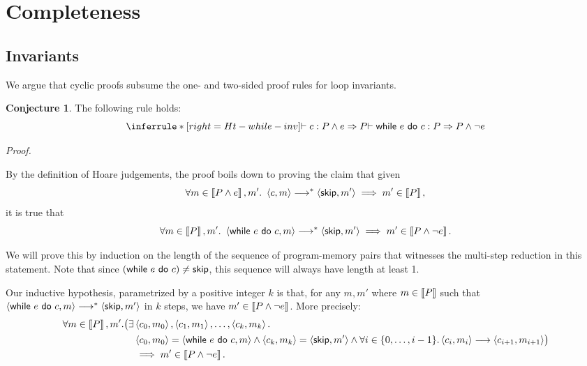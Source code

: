 \documentclass[10pt]{article}
\theoremstyle{definition}
\newtheorem{conjecture}{Conjecture}
\begin{document}
\section{Completeness}

\subsection*{Invariants}

We argue that cyclic proofs subsume the one- and two-sided proof rules for loop invariants.


\begin{conjecture}
The following rule holds:
\begin{displaymath}
    \inferrule*[right=Ht-while-inv]
    { \DER \Triple c : P \wedge e => P }
    { \DER \Triple \While e do c : P => P \wedge \neg e }
\end{displaymath}
\end{conjecture}

\noindent
\emph{Proof.}

\noindent
By the definition of Hoare judgements, the proof boils down to proving 
the claim that given 
\[
    \forall m \in \Interp{P \wedge e}, m'.\
    \Cfg(c, m) \sstepstotrans \Cfg(\Skip, m') 
    \implies m' \in \Interp{P},
\]
it is true that 
\[
    \forall m \in \Interp{P}, m'.\
    \Cfg(\While e do c, m) \sstepstotrans \Cfg(\Skip, m')
    \implies m' \in \Interp{P \wedge \neg e}.
\]

We will prove this by induction on the length of the sequence of program-memory pairs that witnesses 
the multi-step reduction in this statement. Note that since $(\While e do c) \neq \Skip$, 
this sequence will always have length at least 1.

Our inductive hypothesis, parametrized by a positive integer $k$ is that, 
for any $m, m'$ where $m \in \left\llbracket P \right\rrbracket$ such that 
$\Cfg(\While e do c, m) \sstepstotrans \Cfg(\Skip, m')$ in $k$ steps, 
we have $m' \in \left\llbracket P \wedge \neg e \right\rrbracket$.
More precisely:
\begin{align*}
    \forall m \in \Interp{P}, m'. 
    \bigl(\exists &\Cfg(c_0, m_0), \Cfg(c_1, m_1), \ldots, \Cfg(c_k, m_k). \\
     &\Cfg(c_0, m_0) = \Cfg(\While e do c, m)
     \wedge \Cfg(c_k, m_k) = \Cfg(\Skip, m') 
     \wedge \forall i \in \{0, \ldots, i-1\}. \Cfg(c_i, m_i) \sstepsto \Cfg(c_{i+1}, m_{i+1}) 
     \bigr) \\
    &\implies m' \in \Interp{P \wedge \neg e}.
\end{align*}
\end{document}
